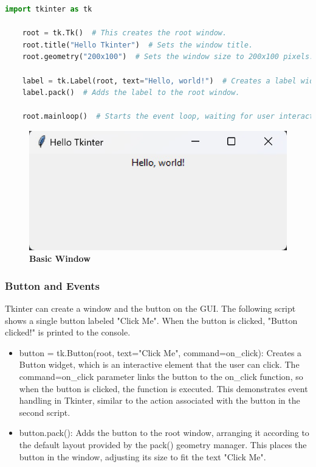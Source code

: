 \begin{lstlisting}[language=Python]
    import tkinter as tk
    
    root = tk.Tk()  # This creates the root window.
    root.title("Hello Tkinter")  # Sets the window title.
    root.geometry("200x100")  # Sets the window size to 200x100 pixels.
    
    label = tk.Label(root, text="Hello, world!")  # Creates a label widget with text.
    label.pack()  # Adds the label to the root window.
    
    root.mainloop()  # Starts the event loop, waiting for user interaction.
\end{lstlisting}

\begin{figure}[h!]

    \centering
    \includegraphics[width=\textwidth]{Images/TKinter/BasicWindows}
    \caption{\textbf{Basic Window}}
\end{figure}

\subsubsection{Button and Events}

Tkinter can create a window  and the button on the GUI. The following script shows a single button labeled "Click Me". When the button is clicked, "Button clicked!" is printed to the console.

\begin{itemize}
   
  \item button = tk.Button(root, text="Click Me", command=on\_click): Creates a Button widget, which is an interactive element that the user can click. The command=on\_click parameter links the button to the on\_click function, so when the button is clicked, the function is executed. This demonstrates event handling in Tkinter, similar to the action associated with the button in the second script. 
    
  \item button.pack(): Adds the button to the root window, arranging it according to the default layout provided by the pack() geometry manager. This places the button in the window, adjusting its size to fit the text "Click Me".
    
\end{itemize}


